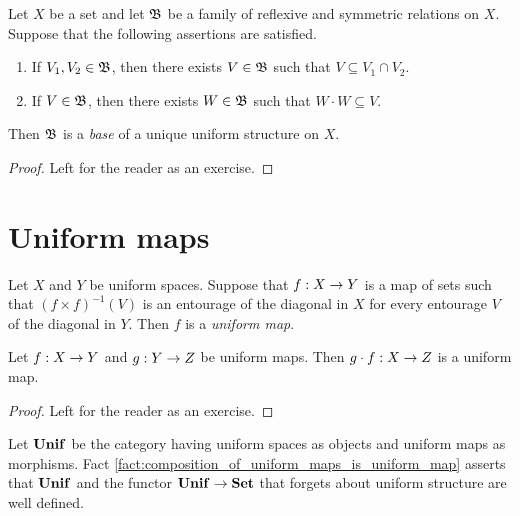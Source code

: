 \documentclass[10pt]{amsart}
\begin{document}
\begin{fact}\label{fact:base_of_uniformity}
		Let $X$ be a set and let ${\mathfrak B}$ be a family of reflexive and symmetric relations on $X$. Suppose that the following assertions are satisfied.
		\begin{enumerate}[label=\emph{\textbf{(\arabic*)}}, leftmargin=3.0em]
		\item If $V_1,V_2 \in {\mathfrak B}$, then there exists $V \in {\mathfrak B}$ such that $V \subseteq V_1\cap V_2$.
		\item If $V \in {\mathfrak B}$, then there exists $W \in {\mathfrak B}$ such that $W\cdot W \subseteq V$.
	\end{enumerate}
	Then ${\mathfrak B}$ is a \textit{base} of a unique uniform structure on $X$.
\end{fact}
\begin{proof}
	Left for the reader as an exercise.
\end{proof}

\section{Uniform maps}

\begin{definition}
	Let $X$ and $Y$ be uniform spaces. Suppose that $f:X\rightarrow Y$ is a map of sets such that $\left(f\times f\right)^{-1}(V)$ is an entourage of the diagonal in $X$ for every entourage $V$ of the diagonal in $Y$. Then $f$ is a \textit{uniform map}.
\end{definition}

\begin{fact}\label{fact:composition_of_uniform_maps_is_uniform_map}
	Let $f:X \rightarrow Y$ and $g:Y \rightarrow Z$ be uniform maps. Then $g\cdot f:X\rightarrow Z$ is a uniform map.
\end{fact}
\begin{proof}
	Left for the reader as an exercise.
\end{proof}
\noindent
Let $\mathbf{Unif}$ be the category having uniform spaces as objects and uniform maps as morphisms. Fact \ref{fact:composition_of_uniform_maps_is_uniform_map} asserts that $\mathbf{Unif}$ and the functor $\mathbf{Unif} \rightarrow \mathbf{Set}$ that forgets about uniform structure are well defined.
\end{document}
